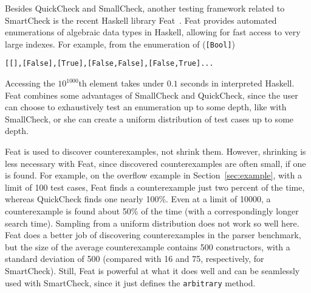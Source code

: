 \documentclass{sigplanconf}
\newenvironment{code}{\begin{alltt}\footnotesize}{\end{alltt}}
\newcommand{\ttp}[1]{\texttt{#1}}
\begin{document}
Besides QuickCheck and SmallCheck, another testing framework related to
SmartCheck is the recent Haskell library Feat~\cite{feat}.  Feat provides
automated enumerations of algebraic data types in Haskell, allowing for fast
access to very large indexes.  For example, from the enumeration of
(\ttp{[Bool]})
%
\begin{code}
[[],[False],[True],[False,False],[False,True] ...
\end{code}
%
\noindent
Accessing the $10^{1000}$th element takes under $0.1$ seconds in interpreted
Haskell.  Feat combines some advantages of SmallCheck and QuickCheck, since the
user can choose to exhaustively test an enumeration up to some depth, like with
SmallCheck, or she can create a uniform distribution of test cases up to some
depth.

Feat is used to discover counterexamples, not shrink them.  However, shrinking
is less necessary with Feat, since discovered counterexamples are often small,
if one is found.  For example, on the overflow example in
Section~\ref{sec:example}, with a limit of 100 test cases, Feat finds a
counterexample just two percent of the time, whereas QuickCheck finds one nearly
100\%.  Even at a limit of 10000, a counterexample is found about 50\% of the
time (with a correspondingly longer search time).  Sampling from a uniform
distribution does not work so well here.  Feat does a better job of discovering
counterexamples in the parser benchmark, but the size of the average
counterexample contains 500 constructors, with a standard deviation of 500
(compared with 16 and 75, respectively, for SmartCheck).  Still, Feat is
powerful at what it does well and can be seamlessly used with SmartCheck, since
it just defines the \ttp{arbitrary} method.


\end{document}
